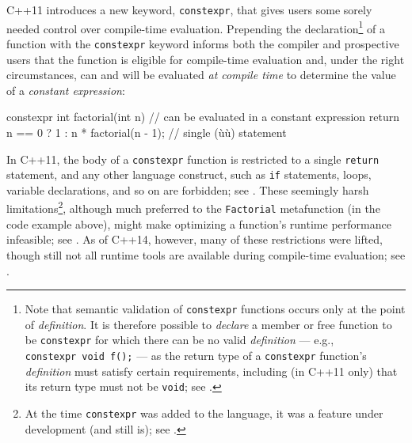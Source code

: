 C++11 introduces a new keyword, \lstinline!constexpr!, that gives users
some sorely needed control over compile-time evaluation. Prepending the
declaration{\cprotect\footnote{Note that semantic validation of
\lstinline!constexpr! functions occurs only at the point of
\emph{definition}. It is therefore possible to \emph{declare} a member
or free function to be \lstinline!constexpr! for which there can be no
valid \emph{definition} --- e.g.,
\lstinline!constexpr!~\lstinline!void!~\lstinline!f();! --- as the return type
of a \lstinline!constexpr! function's \emph{definition} must satisfy
certain requirements, including (in C++11 only) that its return type
must not be \lstinline!void!; see .}} of a function
with the \lstinline!constexpr! keyword informs both the compiler and
prospective users that the function is eligible for compile-time
evaluation and, under the right circumstances, can and will be evaluated
\emph{at compile time} to determine the value of a \emph{constant
expression}:

\begin{emcppslisting}[emcppsbatch=e2]
constexpr int factorial(int n)  // can be evaluated in a constant expression
{
    return n == 0 ? 1 : n * factorial(n - 1);  // single (ù{}ù) statement
}
\end{emcppslisting}
    

\noindent In C++11, the body of a \lstinline!constexpr! function is restricted to a
single \lstinline!return! statement, and any other language construct, such
as \lstinline!if! statements, loops, variable declarations, and so on are
forbidden; see . These seemingly harsh
limitations{\cprotect\footnote{At the time \lstinline!constexpr! was added
to the language, it was a feature under development (and still is);
  see .}}, although much
preferred to the \lstinline!Factorial! metafunction (in the code example
above), might make optimizing a function's runtime performance
infeasible; see . As of
C++14, however, many of these restrictions were lifted, though still not
all runtime tools are available during compile-time evaluation; see
.

